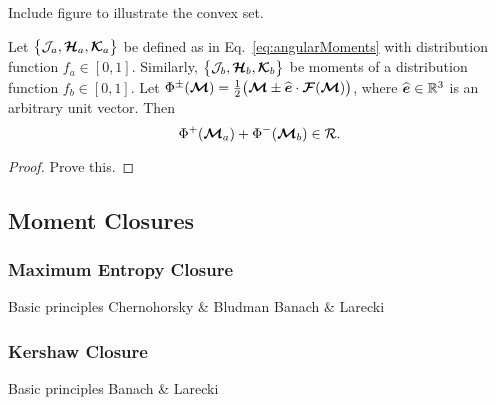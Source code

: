 Include figure to illustrate the convex set.  

\begin{lemma}
  Let $\big\{\mathcal{J}_{a},\boldsymbol{\mathcal{H}}_{a},\boldsymbol{\mathcal{K}}_{a}\big\}$ be defined as in Eq.~\eqref{eq:angularMoments} with distribution function $f_{a}\in[0,1]$.  
  Similarly, $\big\{\mathcal{J}_{b},\boldsymbol{\mathcal{H}}_{b},\boldsymbol{\mathcal{K}}_{b}\big\}$ be moments of a distribution function $f_{b}\in[0,1]$.  
  Let $\Phi^{\pm}(\boldsymbol{\mathcal{M}})=\frac{1}{2}\big(\boldsymbol{\mathcal{M}}\pm\widehat{\boldsymbol{e}}\cdot\boldsymbol{\mathcal{F}}(\boldsymbol{\mathcal{M}})\big)$, where $\widehat{\boldsymbol{e}}\in\mathbb{R}^{3}$ is an arbitrary unit vector.  
  Then
  \begin{equation}
    \Phi^{+}(\boldsymbol{\mathcal{M}}_{a})+\Phi^{-}(\boldsymbol{\mathcal{M}}_{b})\in\mathcal{R}.
  \end{equation}
\end{lemma}
\begin{proof}
  Prove this.
\end{proof}

\subsection{Moment Closures}

\subsubsection{Maximum Entropy Closure}
Basic principles
Chernohorsky \& Bludman
Banach \& Larecki

\subsubsection{Kershaw Closure}
Basic principles
Banach \& Larecki